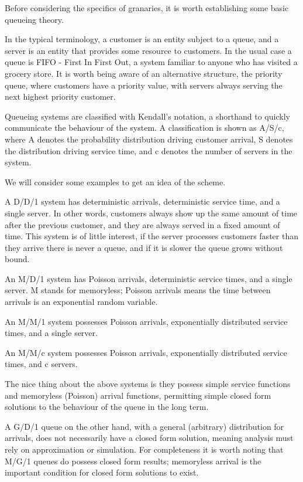 \documentclass[a4paper, 10.5pt, oneside]{report}
\begin{document}
Before considering the specifics of granaries, it is worth establishing some basic queueing theory.

In the typical terminology, a customer is an entity subject to a queue, and a server is an entity that
provides some resource to customers. In the usual case a queue is FIFO - First In First Out, a system familiar
to anyone who has visited a grocery store. It is worth being aware of an alternative structure, the priority queue,
where customers have a priority value, with servers always serving the next highest priority customer.

Queueing systems are classified with Kendall's notation, a shorthand to quickly communicate the behaviour of the system.
A classification is shown as A/S/c, where A denotes the probability distribution driving customer arrival,
S denotes the distribution driving service time, and c denotes the number of servers in the system.

We will consider some examples to get an idea of the scheme.

A D/D/1 system has deterministic arrivals, deterministic service time, and a single server. In other words, customers
always show up the same amount of time after the previous customer, and they are always served in a fixed amount
of time. This system is of little interest, if the server processes customers faster than they arrive
there is never a queue, and if it is slower the queue grows without bound.

An M/D/1 system has Poisson arrivals, deterministic service times, and a single server. M stands for memoryless; Poisson
arrivals means the time between arrivals is an exponential random variable.

An M/M/1 system possesses Poisson arrivals, exponentially distributed service times, and a single server.

An M/M/c system possesses Poisson arrivals, exponentially distributed service times, and c servers.

The nice thing about the above systems is they possess simple service functions and memoryless (Poisson) arrival functions,
permitting simple closed form solutions to the behaviour of the queue in the long term.

A G/D/1 queue on the other hand, with a general (arbitrary) distribution for arrivals, does not necessarily
have a closed form solution, meaning analysis must rely on approximation or simulation. For completeness it is worth noting that
M/G/1 queues do possess closed form results; memoryless arrival is the important condition for closed form solutions to exist.
\end{document}
